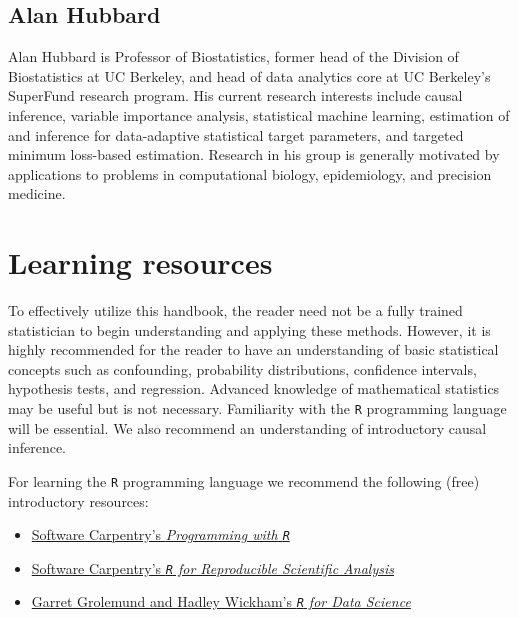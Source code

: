 \documentclass[12pt, krantz2,]{krantz}
\newcommand{\passthrough}[1]{#1}
\providecommand{\tightlist}{%
  \setlength{\itemsep}{0pt}\setlength{\parskip}{0pt}}
\theoremstyle{definition}
\theoremstyle{definition}
\theoremstyle{definition}
\newcommand{\1}{\mathbbm{1}}
\begin{document}
\hypertarget{alan-hubbard}{%
\subsection*{Alan Hubbard}\label{alan-hubbard}}


Alan Hubbard is Professor of Biostatistics, former head of the Division of
Biostatistics at UC Berkeley, and head of data analytics core at UC Berkeley's
SuperFund research program. His current research interests include causal
inference, variable importance analysis, statistical machine learning,
estimation of and inference for data-adaptive statistical target parameters, and
targeted minimum loss-based estimation. Research in his group is generally
motivated by applications to problems in computational biology, epidemiology,
and precision medicine.

\hypertarget{learn}{%
\section{Learning resources}\label{learn}}

To effectively utilize this handbook, the reader need not be a fully trained
statistician to begin understanding and applying these methods. However, it is
highly recommended for the reader to have an understanding of basic statistical
concepts such as confounding, probability distributions, confidence intervals,
hypothesis tests, and regression. Advanced knowledge of mathematical statistics
may be useful but is not necessary. Familiarity with the \passthrough{\lstinline!R!} programming
language will be essential. We also recommend an understanding of introductory
causal inference.

For learning the \passthrough{\lstinline!R!} programming language we recommend the following (free)
introductory resources:

\begin{itemize}
\tightlist
\item
  \href{http://swcarpentry.github.io/r-novice-inflammation/}{Software Carpentry's \emph{Programming with
  \passthrough{\lstinline!R!}}}
\item
  \href{http://swcarpentry.github.io/r-novice-gapminder/}{Software Carpentry's \emph{\passthrough{\lstinline!R!} for Reproducible Scientific
  Analysis}}
\item
  \href{https://r4ds.had.co.nz}{Garret Grolemund and Hadley Wickham's \emph{\passthrough{\lstinline!R!} for Data
  Science}}
\end{itemize}
\end{document}
